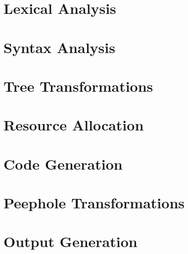 \documentclass[times, 10pt,%
]{article}
\begin{document}
\section{Lexical Analysis}
\label{section:lexicalanalysis}


%

\section{Syntax Analysis}
\label{section:syntacticanalysis}



\section{Tree Transformations}
\label{section:machineindependentoptimizations}



\section{Resource Allocation}
\label{section:addressassign}


\section{Code Generation}
\label{section:codegeneration}


\section{Peephole Transformations}
\label{section:peephole}


\section{Output Generation}
\label{section:output}

\end{document}
